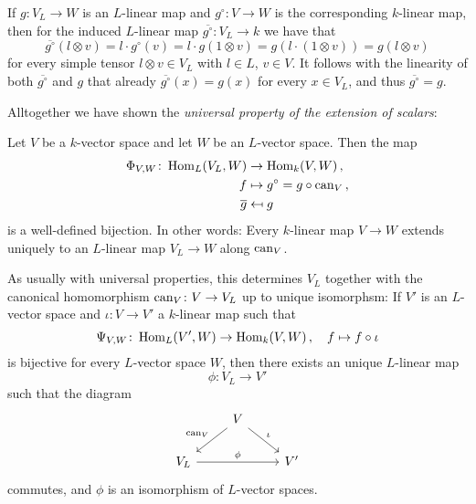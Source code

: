 \begin{fluff}
  If $g \colon V_L \to W$ is an $L$-linear map and $g^\circ \colon V \to W$ is the corresponding $k$-linear map, then for the induced $L$-linear map $\overline{g^\circ} \colon V_L \to k$ we have that
  \[
      \overline{g^\circ}(l \otimes v)
    = l \cdot g^\circ(v)
    = l \cdot g(1 \otimes v)
    = g(l \cdot (1 \otimes v))
    = g(l \otimes v)
  \]
  for every simple tensor $l \otimes v \in V_L$ with $l \in L$, $v \in V$.
  It follows with the linearity of both $\overline{g^\circ}$ and $g$ that already $\overline{g^\circ}(x) = g(x)$ for every $x \in V_L$, and thus $\overline{g^\circ} = g$.
  
  Alltogether we have shown the \emph{universal property of the extension of scalars}:
\end{fluff}


\begin{theorem}
  \label{theorem: universal property of extension of scalars}
  Let $V$ be a $k$-vector space and let $W$ be an $L$-vector space.
  Then the map
  \begin{align*}
                \Phi_{V,W}
    \colon      \operatorname{Hom}_L(V_L, W)
    &\to        \operatorname{Hom}_k(V,W) \,, \\
                f
    &\mapsto    g^\circ
     =          g \circ \operatorname{can}_V \,,  \\
                \overline{g}
    &\mapsfrom  g
  \end{align*}
  is a well-defined bijection.
  In other words:
  Every $k$-linear map $V \to W$ extends uniquely to an $L$-linear map $V_L \to W$ along $\operatorname{can}_V$.
\end{theorem}

\begin{remark}
  As usually with universal properties, this determines $V_L$ together with the canonical homomorphism $\operatorname{can}_V \colon V \to V_L$ up to unique isomorphsm:
  If $V'$ is an $L$-vector space and $\iota \colon V \to V'$ a $k$-linear map such that
  \[
            \Psi_{V,W}
    \colon  \operatorname{Hom}_L(V', W)
    \to     \operatorname{Hom}_k(V,W) \,,
    \quad   f
    \mapsto f \circ \iota
  \]
  is bijective for every $L$-vector space $W$, then there exists an unique $L$-linear map
  \[
    \phi \colon V_L \to V'
  \]
  such that the diagram
  \[
    \begin{tikzcd}
        {}
      & V
        \arrow[swap]{dl}{\can_V}
        \arrow{dr}{\iota}
      & {}
      \\
        V_L
        \arrow{rr}{\phi}
      & {}
      & V'
    \end{tikzcd}
  \]
  commutes, and $\phi$ is an isomorphism of $L$-vector spaces.
\end{remark}


